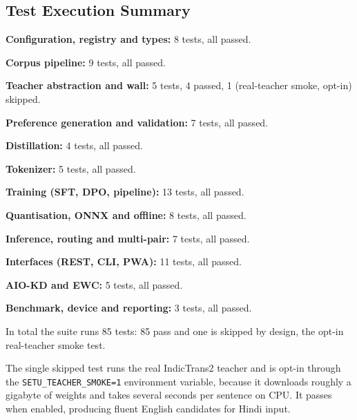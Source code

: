 \subsection{Test Execution Summary}
\label{subsec:testsummary}

\begin{bullets}
\item \textbf{Configuration, registry and types:} 8 tests, all passed.
\item \textbf{Corpus pipeline:} 9 tests, all passed.
\item \textbf{Teacher abstraction and wall:} 5 tests, 4 passed, 1 (real-teacher smoke, opt-in) skipped.
\item \textbf{Preference generation and validation:} 7 tests, all passed.
\item \textbf{Distillation:} 4 tests, all passed.
\item \textbf{Tokenizer:} 5 tests, all passed.
\item \textbf{Training (SFT, DPO, pipeline):} 13 tests, all passed.
\item \textbf{Quantisation, ONNX and offline:} 8 tests, all passed.
\item \textbf{Inference, routing and multi-pair:} 7 tests, all passed.
\item \textbf{Interfaces (REST, CLI, PWA):} 11 tests, all passed.
\item \textbf{AIO-KD and EWC:} 5 tests, all passed.
\item \textbf{Benchmark, device and reporting:} 3 tests, all passed.
\end{bullets}

In total the suite runs 85 tests: 85 pass and one is skipped by design, the opt-in real-teacher smoke test.

The single skipped test runs the real IndicTrans2 teacher and is opt-in through
the \texttt{SETU\_TEACHER\_SMOKE=1} environment variable, because it downloads
roughly a gigabyte of weights and takes several seconds per sentence on CPU. It
passes when enabled, producing fluent English candidates for Hindi input.
